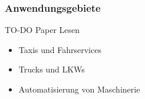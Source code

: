 \begin{frame}
    \frametitle{Anwendungsgebiete}

    TO-DO Paper Lesen

    \begin{itemize}
        \item Taxis und Fahrservices
        \item Trucks und LKWs
        \item Automatisierung von Maschinerie
    \end{itemize}

    

\end{frame}